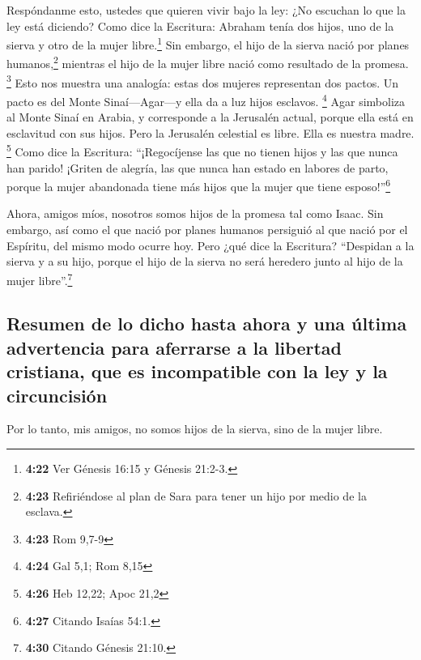  Respóndanme esto, ustedes que quieren vivir bajo la ley:
¿No escuchan lo que la ley está diciendo?  Como dice la
Escritura: Abraham tenía dos hijos, uno de la sierva y otro de la mujer
libre.\footnote{\textbf{4:22} Ver Génesis 16:15 y Génesis 21:2-3.}
 Sin embargo, el hijo de la sierva nació por planes
humanos,\footnote{\textbf{4:23} Refiriéndose al plan de Sara para tener
  un hijo por medio de la esclava.} mientras el hijo de la mujer libre
nació como resultado de la promesa. \footnote{\textbf{4:23} Rom 9,7-9}
 Esto nos muestra una analogía: estas dos mujeres
representan dos pactos. Un pacto es del Monte Sinaí---Agar---y ella da a
luz hijos esclavos. \footnote{\textbf{4:24} Gal 5,1; Rom 8,15}
 Agar simboliza al Monte Sinaí en Arabia, y corresponde a
la Jerusalén actual, porque ella está en esclavitud con sus hijos.
 Pero la Jerusalén celestial es libre. Ella es nuestra
madre. \footnote{\textbf{4:26} Heb 12,22; Apoc 21,2} 
Como dice la Escritura: ``¡Regocíjense las que no tienen hijos y las que
nunca han parido! ¡Griten de alegría, las que nunca han estado en
labores de parto, porque la mujer abandonada tiene más hijos que la
mujer que tiene esposo!''\footnote{\textbf{4:27} Citando Isaías 54:1.}

 Ahora, amigos míos, nosotros somos hijos de la promesa
tal como Isaac.  Sin embargo, así como el que nació por
planes humanos persiguió al que nació por el Espíritu, del mismo modo
ocurre hoy.  Pero ¿qué dice la Escritura? ``Despidan a la
sierva y a su hijo, porque el hijo de la sierva no será heredero junto
al hijo de la mujer libre''.\footnote{\textbf{4:30} Citando Génesis
  21:10.}

\hypertarget{resumen-de-lo-dicho-hasta-ahora-y-una-uxfaltima-advertencia-para-aferrarse-a-la-libertad-cristiana-que-es-incompatible-con-la-ley-y-la-circuncisiuxf3n}{%
\subsection{Resumen de lo dicho hasta ahora y una última advertencia
para aferrarse a la libertad cristiana, que es incompatible con la ley y
la
circuncisión}\label{resumen-de-lo-dicho-hasta-ahora-y-una-uxfaltima-advertencia-para-aferrarse-a-la-libertad-cristiana-que-es-incompatible-con-la-ley-y-la-circuncisiuxf3n}}

 Por lo tanto, mis amigos, no somos hijos de la sierva,
sino de la mujer libre.

